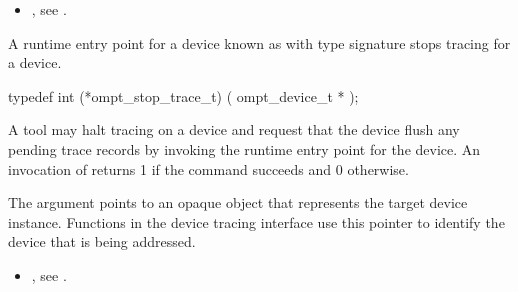 \crossreferences
\begin{itemize}
\item {},
see .
\end{itemize}

\label{sec:ompt_stop_trace_t}

\summary
A runtime entry point for a device known as 
with type signature 
stops tracing for a device.

\begin{ccppspecific}
\begin{omptInquiry}
typedef int (*ompt_stop_trace_t) (
  ompt_device_t *
);
\end{omptInquiry}
\end{ccppspecific}

\descr

A tool may halt tracing on a device and request that the device flush any pending trace records
by invoking the  runtime entry point for the device.
An invocation of  returns 1 if the command
succeeds and 0 otherwise.

\argdesc
The  argument points to an opaque object that represents
the target device instance. Functions in the device tracing interface
use this pointer to identify the device that is being addressed.



\crossreferences
\begin{itemize}
\item {},
see .
\end{itemize}

\label{sec:ompt_advance_buffer_cursor_t}


